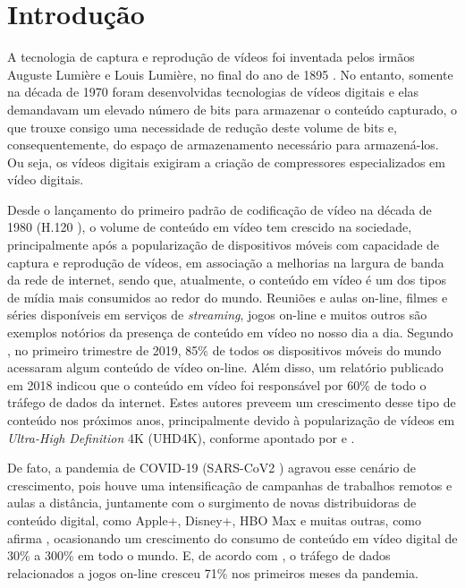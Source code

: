 \chapter{Introdução}
\label{cap:1}

A tecnologia de captura e reprodução de vídeos foi inventada pelos irmãos Auguste Lumière e Louis Lumière, no final do ano de 1895 \cite{bib:lumiere}. No entanto, somente na década de 1970 foram desenvolvidas tecnologias de vídeos digitais \cite{bib:videocodechistory} e elas demandavam um elevado número de bits para armazenar o conteúdo capturado, o que trouxe consigo uma necessidade de redução deste volume de bits e, consequentemente,  do espaço de armazenamento necessário para armazená-los. Ou seja, os vídeos digitais exigiram a criação de compressores especializados em vídeo digitais.

Desde o lançamento do primeiro padrão de codificação de vídeo na década de 1980 (H.120 \cite{bib:h120}), o volume de conteúdo em vídeo tem crescido na sociedade, principalmente após a popularização de dispositivos móveis com capacidade de captura e reprodução de vídeos, em associação a melhorias na largura de banda da rede de internet, sendo que, atualmente, o conteúdo em vídeo é um dos tipos de mídia mais consumidos ao redor do mundo. Reuniões e aulas on-line, filmes e séries disponíveis em serviços de \textit{streaming}, jogos on-line e muitos outros são exemplos notórios da presença de conteúdo em vídeo no nosso dia a dia. Segundo \cite{bib:statista_2021}, no primeiro trimestre de 2019, 85\% de todos os dispositivos móveis do mundo acessaram algum conteúdo de vídeo on-line. Além disso, um relatório publicado em 2018 \cite{bib:statistaVideoTraffic} indicou que o conteúdo em vídeo foi responsável por 60\% de todo o tráfego de dados da internet. Estes autores preveem um crescimento desse tipo de conteúdo nos próximos anos, principalmente devido à popularização de vídeos em \textit{Ultra-High Definition} 4K (UHD4K), conforme apontado por \cite{bib:cisco_2020} e \cite{bib:bitmovin_report_2021}.

De fato, a pandemia de COVID-19 (SARS-CoV2 \cite{bib:covid19}) agravou esse cenário de crescimento, pois houve uma intensificação de campanhas de trabalhos remotos e aulas a distância, juntamente com o surgimento de novas distribuidoras de conteúdo digital, como Apple+, Disney+, HBO Max e muitas outras, como afirma \citet{bib:bitmovin_report_2020}, ocasionando um crescimento do consumo de conteúdo em vídeo digital de 30\% \cite{bib:ramirez_2020, bib:clapp_2021} a 300\% \cite{bib:bottger_2020} em todo o mundo. E, de acordo com \cite{bib:verizon_2021}, o tráfego de dados relacionados a jogos on-line cresceu 71\% nos primeiros meses da pandemia.

